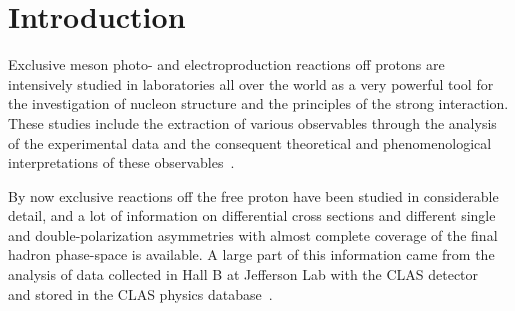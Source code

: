 \chapter{Introduction}
\label{Sect:motiv}


Exclusive meson photo- and electroproduction reactions off protons are intensively studied in laboratories all over the world as a very powerful tool for the investigation of nucleon structure and the principles of the strong interaction. These studies include the extraction of various observables through the analysis of the experimental data and the consequent theoretical and phenomenological interpretations of these observables~\cite{Krusche:2003ik,Aznauryan:2011qj,Skorodumina:2016pnb}.



By now exclusive reactions off the free proton have been studied in considerable detail, and a lot of information on differential cross sections and different single and double-polarization asymmetries with almost complete coverage of the final hadron phase-space is available. A large part of this information came from the analysis of data collected in Hall B at Jefferson Lab with the CLAS detector~\cite{Mecking:2003zu} and stored in the CLAS physics database~\cite{CLAS_DB}.



